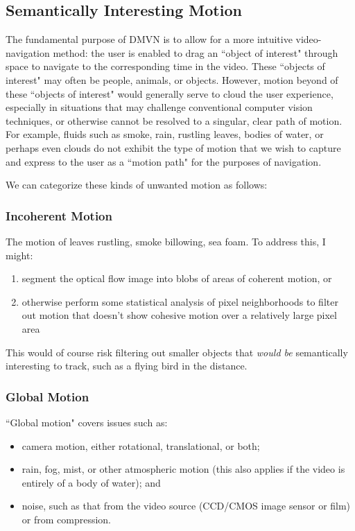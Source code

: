 \subsection{Semantically Interesting Motion}
    The fundamental purpose of DMVN is to allow for a more intuitive video-navigation method: the user is enabled to drag an ``object of interest" through space to navigate to the corresponding time in the video. These ``objects of interest" may often be people, animals, or objects. However, motion beyond of these ``objects of interest" would generally serve to cloud the user experience, especially in situations that may challenge conventional computer vision techniques, or otherwise cannot be resolved to a singular, clear path of motion. For example, fluids such as smoke, rain, rustling leaves, bodies of water, or perhaps even clouds do not exhibit the type of motion that we wish to capture and express to the user as a ``motion path" for the purposes of navigation.
\par We can categorize these kinds of unwanted motion as follows:
\subsubsection{Incoherent Motion}
    The motion of leaves rustling, smoke billowing, sea foam. To address this, I might:
    \begin{enumerate}
    \item segment the optical flow image into blobs of areas of coherent motion, or
    \item otherwise perform some statistical analysis of pixel neighborhoods to filter out motion that doesn't show cohesive motion over a relatively large pixel area
    \end{enumerate}
    This would of course risk filtering out smaller objects that \emph{would be} semantically interesting to track, such as a flying bird in the distance.
\subsubsection{Global Motion}
    ``Global motion" covers issues such as:
    \begin{itemize}
    \item camera motion, either rotational, translational, or both;
    \item rain, fog, mist, or other atmospheric motion (this also applies if the video is entirely of a body of water); and
    \item noise, such as that from the video source (CCD/CMOS image sensor or film) or from compression.
    \end{itemize}

